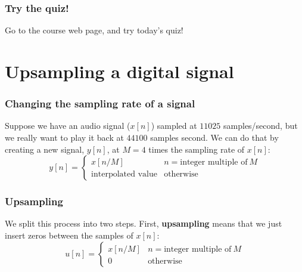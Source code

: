 \documentclass{beamer}
\begin{document}
\begin{frame}
  \frametitle{Try the quiz!}

  Go to the course web page, and try today's quiz!
\end{frame}

\section[Upsampling]{Upsampling a digital signal}
\setcounter{subsection}{1}

\begin{frame}
  \frametitle{Changing the sampling rate of a signal}

  Suppose we have an audio signal ($x[n]$) sampled at $11025$
  samples/second, but we really want to play it back at $44100$
  samples second.  We can do that by creating a new signal, $y[n]$, at
  $M=4$ times the sampling rate of $x[n]$:
  \begin{displaymath}
    y[n] = \left\{\begin{array}{ll}
    x[n/M] & n=\text{integer multiple of}~M\\
    \text{interpolated value}&\text{otherwise}
    \end{array}\right.
  \end{displaymath}
\end{frame}

\begin{frame}
  \frametitle{Upsampling}

  We split this process into two steps.  First, {\bf upsampling} means
  that we just insert zeros between the samples of $x[n]$:
  \begin{displaymath}
    u[n] = \left\{\begin{array}{ll}
    x[n/M] & n=\text{integer multiple of}~M\\
    0&\text{otherwise}
    \end{array}\right.
  \end{displaymath}
\end{frame}
\end{document}
